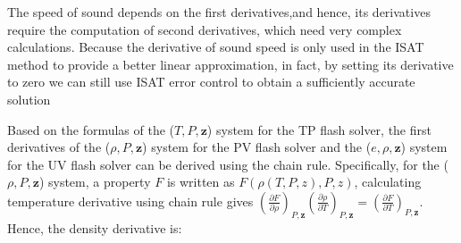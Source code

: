 The speed of sound depends on the first derivatives,and hence, its derivatives require the computation of second derivatives, which need very complex calculations. Because the derivative of sound speed is only used in the ISAT method to provide a better linear approximation, in fact, by setting its derivative to zero we can still use ISAT error control to obtain a sufficiently accurate solution


Based on the formulas of the ($T,P,\mathbf{z}$) system for the TP flash solver, the first derivatives of the ($\rho,P, \mathbf{z}$) system for the PV flash solver and the ($e,\rho, \mathbf{z}$) system for the UV flash solver can be derived using the chain rule. Specifically, for the ($\rho,P,\mathbf{z}$) system, a property $F$ is written as $F(\rho(T,P,z),P,z)$, calculating temperature derivative using chain rule gives $\left(\frac{\partial F} {\partial \rho}\right)_{P,\mathbf{z}}\left(\frac{\partial \rho}{\partial T}\right)_{P,\mathbf{z}}= \left(\frac{\partial F}{\partial T}\right)_{P,\mathbf{z}}$. Hence, the density derivative is:

